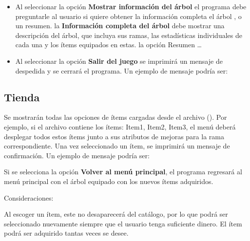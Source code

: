 \begin{itemize}
    
    \item Al seleccionar la opción \textbf{Mostrar información del árbol}
     el programa debe preguntarle al usuario si quiere obtener la información completa el árbol , o un resumen. la \textbf{Información completa del árbol} debe mostrar una descripción del árbol, que incluya sus ramas, las estadísticas individuales de cada una y los ítems equipados en estas. la opción Resumen …
    
    \item Al seleccionar la opción \textbf{Salir del juego} se imprimirá un mensaje de despedida y se cerrará el programa. Un ejemplo de mensaje podría ser: 

    
\end{itemize}


\subsection{Tienda}
\label{subsec:Tienda}

Se mostrarán todas las opciones de ítems cargadas desde el archivo (). Por ejemplo, si el archivo contiene los ítems: {Item1, Item2, Item3}, el menú deberá desplegar todos estos ítems junto a sus atributos de mejoras para la rama correspondiente. Una vez seleccionado un ítem, se imprimirá un mensaje de confirmación. Un ejemplo de mensaje podría ser:

Si se selecciona la opción \textbf{Volver al menú principal}, el programa regresará al menú principal con el árbol equipado con los nuevos ítems adquiridos.

Consideraciones: 

Al escoger un ítem, este no desaparecerá del catálogo, por lo que podrá ser seleccionado nuevamente siempre que el usuario tenga suficiente dinero. El ítem podrá ser adquirido tantas veces se desee.  
